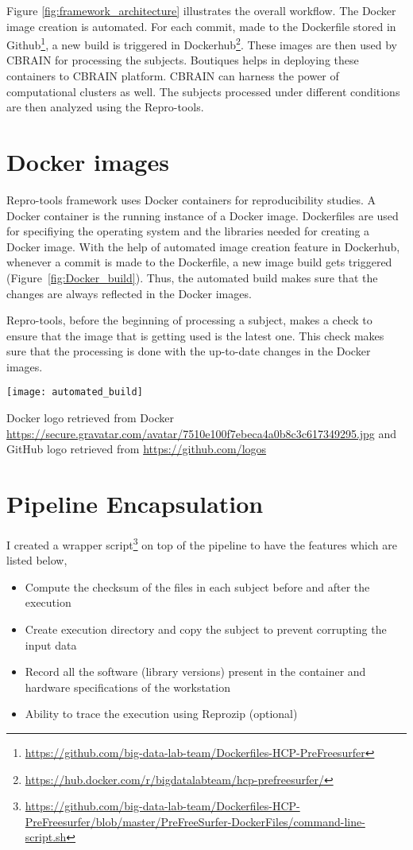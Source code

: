 Figure \ref{fig:framework_architecture} illustrates the overall workflow. The Docker image creation is automated. For each commit, made to the Dockerfile stored in Github\footnote{\url{https://github.com/big-data-lab-team/Dockerfiles-HCP-PreFreesurfer}}, a new build is triggered in Dockerhub\footnote{\url{https://hub.docker.com/r/bigdatalabteam/hcp-prefreesurfer/}}. These images are then used by CBRAIN for processing the subjects. Boutiques helps in deploying these containers to CBRAIN platform. CBRAIN can harness the power of computational clusters as well. The subjects processed under different conditions are then analyzed using the Repro-tools.

\section{Docker images}
Repro-tools framework uses Docker containers for reproducibility studies. A Docker container is the running instance of a Docker image. Dockerfiles are used for specifiying the operating system and the libraries needed for creating a Docker image. With the help of automated image creation feature in Dockerhub, whenever a commit is made to the Dockerfile, a new image build gets triggered (Figure~\ref{fig:Docker_build}). Thus, the automated build makes sure that the changes are always reflected in the Docker images.

Repro-tools, before the beginning of processing a subject, makes a check to ensure that the image that is getting used is the latest one. This check makes sure that the processing is done with the up-to-date changes in the Docker images.

\begin{center}
  \texttt{[image: automated\_build]}
  \label{fig:Docker_build}
  \caption*{Docker logo retrieved from Docker \url{https://secure.gravatar.com/avatar/7510e100f7ebeca4a0b8c3c617349295.jpg} and GitHub logo retrieved from \url{https://github.com/logos}}
\end{center}

\section{Pipeline Encapsulation}
I created a wrapper script\footnote{\url{https://github.com/big-data-lab-team/Dockerfiles-HCP-PreFreesurfer/blob/master/PreFreeSurfer-DockerFiles/command-line-script.sh}} on top of the pipeline to have the features which are listed below,
\begin{itemize}
  \item Compute the checksum of the files in each subject before and after the execution
  \item Create execution directory and copy the subject to prevent corrupting the input data
  \item Record all the software (library versions) present in the container and hardware specifications of the workstation
  \item Ability to trace the execution using Reprozip (optional)
\end{itemize}

